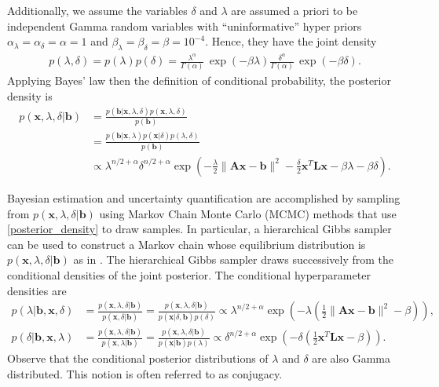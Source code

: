\documentclass{article}
\newcommand{\vect}[1]{\boldsymbol{#1}}
\begin{document}
Additionally, we assume the variables $\delta$ and $\lambda$ are assumed a priori to be independent Gamma random variables with ``uninformative'' hyper priors $\alpha_\lambda = \alpha_\delta = \alpha = 1$ and $\beta_\lambda = \beta_\delta = \beta =  10^{-4}$. 
Hence, they have the joint density
\begin{align*}
  p(\lambda,\delta) = p(\lambda)p(\delta) = \frac{\lambda^{\alpha}}{\Gamma(\alpha)}\,\exp(-\beta\lambda) \frac{\delta^{\alpha}}{\Gamma(\alpha)}\,\exp(-\beta\delta).
\end{align*}
Applying Bayes' law then the definition of conditional probability, the posterior density is
\begin{align}
p(\vect x,\lambda,\delta|\vect b) 
&= \frac{p(\vect b|\vect x,\lambda,\delta) p(\vect x,\lambda,\delta)}{p(\vect b)} \nonumber \\
&= \frac{p(\vect b|\vect x,\lambda) p(\vect x| \delta) p(\lambda,\delta)}{p(\vect b)} \nonumber \\
&\propto \lambda^{n/2+\alpha}\delta^{n/2+\alpha} \exp\left(-\frac{\lambda}{2}\|\vect{Ax} - \vect b\|^2 - \frac{\delta}{2}\vect x^T \vect L \vect x - \beta\lambda - \beta\delta \right). \label{posterior_density}
\end{align}

Bayesian estimation and uncertainty quantification are accomplished by sampling from $p(\vect x,\lambda,\delta|\vect b)$ using Markov Chain Monte Carlo (MCMC) methods that use \eqref{posterior_density} to draw samples. In particular, a hierarchical Gibbs sampler can be used to construct a Markov chain whose equilibrium distribution is $p(\vect x,\lambda,\delta|\vect b)$ as in \cite{bardsley2012mcmc}. 
The hierarchical Gibbs sampler draws successively from the conditional densities of the joint posterior.  The conditional hyperparameter densities are
\begin{align*}
  p(\lambda| \vect b,\vect x,\delta) 
  &= \frac{p(\vect x,\lambda,\delta|\vect b)}{p(\vect x,\delta|\vect b) } 
  = \frac{p(\vect x,\lambda,\delta|\vect b)}{p(\vect x|\delta,\vect b)p(\delta) }
  \propto \lambda^{n/2+\alpha}\exp\left(-\lambda\left(\frac{1}{2}\|\vect{Ax} - \vect b\|^2 - \beta\right)  \right),\\
  p(\delta| \vect b,\vect x,\lambda) 
  &= \frac{p(\vect x,\lambda,\delta|\vect b)}{p(\vect x,\lambda|\vect b) } 
  = \frac{p(\vect x,\lambda,\delta|\vect b)}{p(\vect x|\vect b)p(\lambda) }
  \propto \delta^{n/2+\alpha}\exp\left(-\delta\left(\frac{1}{2}\vect x^T\vect L\vect x - \beta\right)  \right). 
\end{align*}
Observe that the conditional posterior distributions of $\lambda$ and $\delta$ are also Gamma distributed.
This notion is often referred to as conjugacy.
\end{document}
